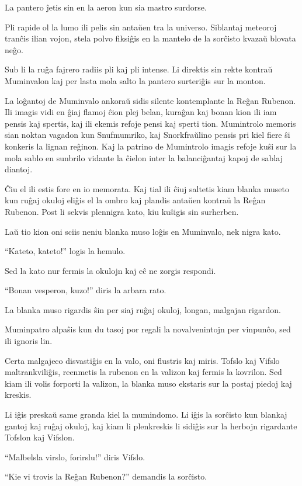 La pantero ĵetis sin en la aeron kun sia mastro surdorse.

Pli rapide ol la lumo ili pelis sin antaŭen tra la universo. Siblantaj meteoroj tranĉis ilian vojon, stela polvo fiksiĝis en la mantelo de la sorĉisto kvazaŭ blovata neĝo.

Sub li la ruĝa fajrero radiis pli kaj pli intense. Li direktis sin rekte kontraŭ Muminvalon kaj per lasta mola salto la pantero surteriĝis sur la monton.

La loĝantoj de Muminvalo ankoraŭ sidis silente kontemplante la Reĝan Rubenon. Ili imagis vidi en ĝiaj flamoj ĉion plej belan, kuraĝan kaj bonan kion ili iam pensis kaj spertis, kaj ili ekemis refoje pensi kaj sperti tion. Mumintrolo memoris sian noktan vagadon kun Snufmumriko, kaj Snorkfraŭlino pensis pri kiel fiere ŝi konkeris la lignan reĝinon. Kaj la patrino de Mumintrolo imagis refoje kuŝi sur la mola sablo en sunbrilo vidante la ĉielon inter la balanciĝantaj kapoj de sablaj diantoj.

Ĉiu el ili estis fore en io memorata. Kaj tial ili ĉiuj saltetis kiam blanka museto kun ruĝaj okuloj eliĝis el la ombro kaj plandis antaŭen kontraŭ la Reĝan Rubenon. Post li sekvis plennigra kato, kiu kuŝigis sin surherben.

Laŭ tio kion oni sciis neniu blanka muso loĝis en Muminvalo, nek nigra kato.

``Kateto, kateto!'' logis la hemulo.

Sed la kato nur fermis la okulojn kaj eĉ ne zorgis respondi.

``Bonan vesperon, kuzo!'' diris la arbara rato.

La blanka muso rigardis ŝin per siaj ruĝaj okuloj, longan, malgajan rigardon.

Muminpatro alpaŝis kun du tasoj por regali la novalvenintojn per vinpunĉo, sed ili ignoris lin.

Certa malgajeco disvastiĝis en la valo, oni flustris kaj miris. Tofslo kaj Vifslo maltrankviliĝis, reenmetis la rubenon en la valizon kaj fermis la kovrilon. Sed kiam ili volis forporti la valizon, la blanka muso ekstaris sur la postaj piedoj kaj kreskis.

Li iĝis preskaŭ same granda kiel la mumindomo. Li iĝis la sorĉisto kun blankaj gantoj kaj ruĝaj okuloj, kaj kiam li plenkreskis li sidiĝis sur la herbojn rigardante Tofslon kaj Vifslon.

``Malbelsla virslo, forirslu!'' diris Vifslo.

``Kie vi trovis la Reĝan Rubenon?'' demandis la sorĉisto.

